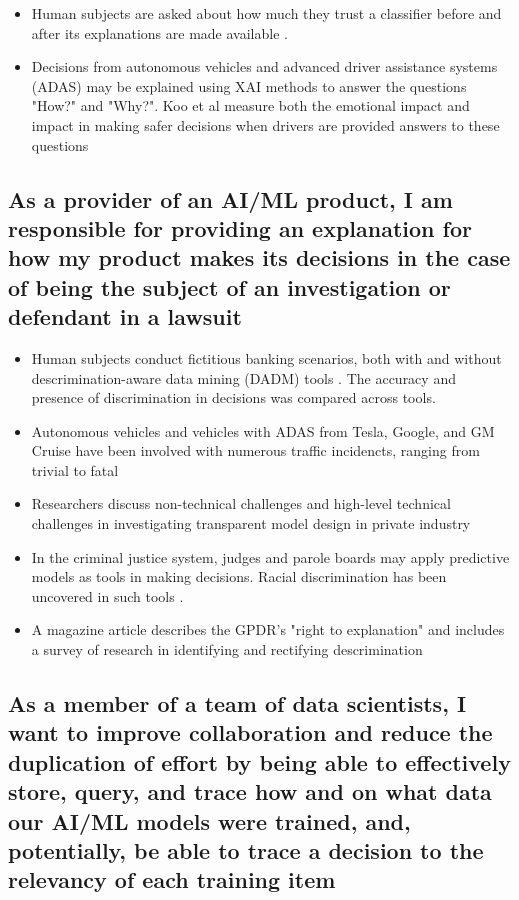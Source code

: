 \documentclass{IEEEtran}
\begin{document}
\begin{itemize}
    \item Human subjects are asked about how much they trust a classifier before and after its explanations are made available \cite{Ribeiro:2016:WIT:2939672.2939778}.  
    \item Decisions from autonomous vehicles and advanced driver assistance systems (ADAS) may be explained using XAI methods to answer the questions "How?" and "Why?".  Koo et al measure both the emotional impact and impact in making safer decisions when drivers are provided answers to these questions \cite{Koo2015}
\end{itemize}

\subsection{As a provider of an AI/ML product, I am responsible for providing an explanation for how my product makes its decisions in the case of being the subject of an investigation or defendant in a lawsuit}

\begin{itemize}
    \item Human subjects conduct fictitious banking scenarios, both with and without descrimination-aware data mining (DADM) tools \cite{Berendt2014}.  The accuracy and presence of discrimination in decisions was compared across tools.
    \item Autonomous vehicles and vehicles with ADAS from Tesla, Google, and GM Cruise have been involved with numerous traffic incidencts, ranging from trivial to fatal \cite{Read2016} \cite{Tesla2018} \cite{Ackerman2016} \cite{Bhavsar2017} 
    \item Researchers discuss non-technical challenges and high-level technical challenges in investigating transparent model design in private industry \cite{Veale:2018:FAD:3173574.3174014}
    \item In the criminal justice system, judges and parole boards may apply predictive models as tools in making decisions.  Racial discrimination has been uncovered in such tools \cite{Wexler.2017} \cite{Angwin2016}.
    \item A magazine article describes the GPDR's "right to explanation" and includes a survey of research in identifying and rectifying descrimination \cite{Goodman2017EuropeanUR}
\end{itemize}

\subsection{As a member of a team of data scientists, I want to improve collaboration and reduce the duplication of effort by being able to effectively store, query, and trace how and on what data our  AI/ML models were trained, and, potentially, be able to trace a decision to the relevancy of each training item}
\end{document}

